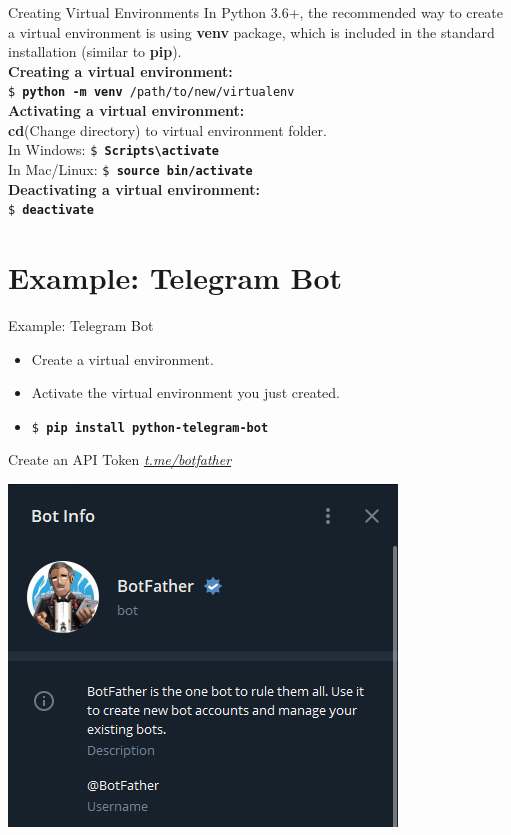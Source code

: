     \begin{frame}{Creating Virtual Environments}
        \LARGE
        \pause
        In Python 3.6+, the recommended way to create a virtual environment is using \textbf{venv} package, which is included in the standard installation (similar to \textbf{pip}).\\
        \pause
        \textbf{Creating a virtual environment:}\\
        \texttt{\$ \textbf{python -m venv} /path/to/new/virtualenv}\\
        \pause
        \textbf{Activating a virtual environment:}\\
        \textbf{cd}(Change directory) to virtual environment folder.\\
        In Windows: \texttt{\$ \textbf{Scripts\textbackslash activate}}\\
        In Mac/Linux: \texttt{\$ \textbf{source bin/activate}}\\
        \pause
        \textbf{Deactivating a virtual environment:}\\
        \texttt{\$ \textbf{deactivate}}
    \end{frame}

    \section{Example: Telegram Bot}
    
    \begin{frame}{Example: Telegram Bot}
        \LARGE
        \pause
        \begin{itemize}
            \item Create a virtual environment.
            \pause
            \item Activate the virtual environment you just created.
            \pause
            \item \texttt{\$ \textbf{pip install python-telegram-bot}} 
        \end{itemize}
    \end{frame}

    \begin{frame}{Create an API Token}
        \pause
        \LARGE
        \href{https://telegram.me/botfather}{\underline{\textit{t.me/botfather}}}\\

        \begin{center}
            \includegraphics[height=0.6\textheight]{images/bot_father.PNG}
        \end{center}
    \end{frame}
    
